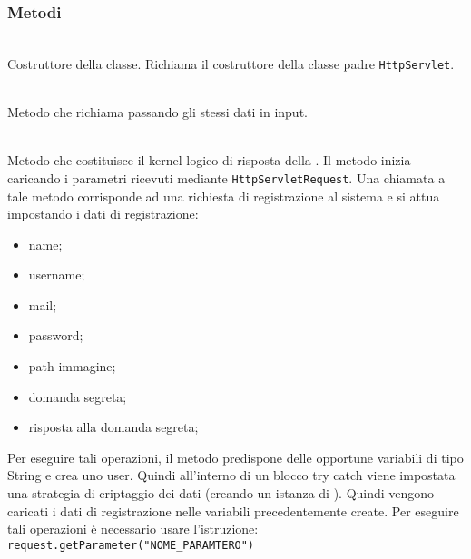 \subsubsection*{Metodi}
\begin{description}
	\item{}\\
	Costruttore della classe. Richiama il costruttore della classe padre \texttt{HttpServlet}.
	
	\item{}\\
	Metodo che richiama  passando gli stessi dati in input.
	
	\item{}\\

Metodo che costituisce il kernel logico di risposta della . Il metodo inizia caricando i parametri ricevuti mediante \texttt{HttpServletRequest}. Una chiamata a tale metodo corrisponde ad una richiesta di registrazione al sistema e si attua impostando i dati di registrazione:
	\begin{itemize}
		\item name;
		\item username;
		\item mail;
		\item password;
		\item path immagine;
		\item domanda segreta;
		\item risposta alla domanda segreta;
	\end{itemize}
	Per eseguire tali operazioni, il metodo predispone delle opportune variabili di tipo String e crea uno  user. Quindi all'interno di un blocco try catch viene impostata una strategia di criptaggio dei dati (creando un istanza di ). Quindi vengono caricati i dati di registrazione nelle variabili precedentemente create. Per eseguire tali operazioni è necessario usare l'istruzione:\\
	
	\verb|request.getParameter("NOME_PARAMTERO")|\\
	

\end{description}
